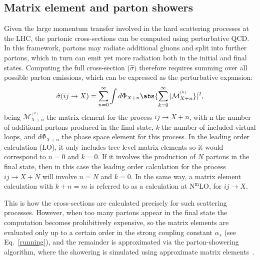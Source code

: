\subsection{Matrix element and parton showers}
\label{subsec:parton_shower}
Given the large momentum transfer involved in the hard scattering processes at the LHC, the partonic cross-sections can be computed using perturbative QCD. In this framework, partons may radiate additional gluons and split into further partons, which in turn can emit yet more radiation both in the initial and final states. Computing the full cross-section ($\hat{\sigma})$ therefore requires summing over all possible parton emissions, which can be expressed as the perturbative expansion:
\begin{equation}
\hat{\sigma}(ij\rightarrow X) = \sum_{n=0}^{\infty}\int d\Phi_{X+n}\abs{\sum_{k=0}^{\infty}|\mathcal{M}_{X+n}^{^{(k)}}}|^2,
\end{equation}
being $\mathcal{M}_{X+n}^{^{(k)}}$ the matrix element for the process $ij \rightarrow X + n$, with n the number of additional partons produced in the final state, $k$ the number of included virtual loops, and $d\Phi_{X+n}$ the phase space element for this process.
In the leading order calculation (LO), it only includes tree level matrix elements so it would correspond to $n=0$ and $k=0$. If it involves the production of $N$ partons in the final state, then in this case the leading order calculation for the process $ij \rightarrow X+N$ will involve $n=N$ and $k=0$.
In the same way, a matrix element calculation with $k + n = m$ is referred to as a calculation at $\text{N}^{\text{m}}$LO, for $ij \rightarrow X$.

This is how the cross-sections are calculated precisely for such scattering processes. However, when too many partons appear in the final state the computation becomes prohibitively expensive, so the matrix elements are evaluated only up to a certain order in the strong coupling constant
 $\alpha_{s}$ (see Eq.~\ref{running}), and the remainder is approximated via the parton-showering algorithm, where the showering is simulated using approximate matrix elements~\cite{FOX1980285}.

